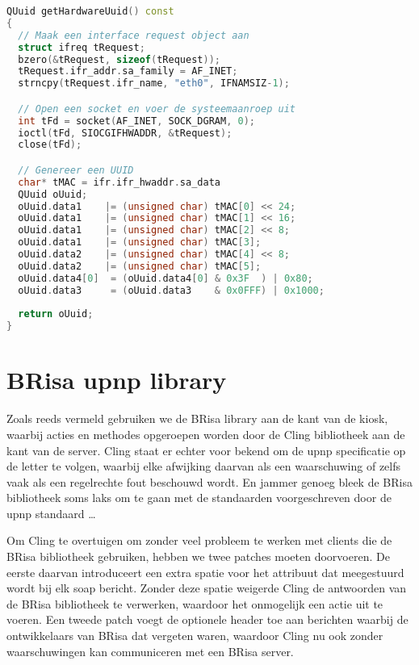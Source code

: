 \begin{lstlisting}[language=C++, float, caption=Generatie van een \acs{uuid}., label=lst:uuid]
QUuid getHardwareUuid() const
{
  // Maak een interface request object aan
  struct ifreq tRequest;
  bzero(&tRequest, sizeof(tRequest));
  tRequest.ifr_addr.sa_family = AF_INET;
  strncpy(tRequest.ifr_name, "eth0", IFNAMSIZ-1);

  // Open een socket en voer de systeemaanroep uit
  int tFd = socket(AF_INET, SOCK_DGRAM, 0);
  ioctl(tFd, SIOCGIFHWADDR, &tRequest);
  close(tFd);

  // Genereer een UUID
  char* tMAC = ifr.ifr_hwaddr.sa_data
  QUuid oUuid;
  oUuid.data1    |= (unsigned char) tMAC[0] << 24;
  oUuid.data1    |= (unsigned char) tMAC[1] << 16;
  oUuid.data1    |= (unsigned char) tMAC[2] << 8;
  oUuid.data1    |= (unsigned char) tMAC[3];
  oUuid.data2    |= (unsigned char) tMAC[4] << 8;
  oUuid.data2    |= (unsigned char) tMAC[5];
  oUuid.data4[0]  = (oUuid.data4[0] & 0x3F  ) | 0x80;
  oUuid.data3     = (oUuid.data3    & 0x0FFF) | 0x1000;
  
  return oUuid;
}
\end{lstlisting}

\section{BRisa \acs{upnp} library}
\label{kiosk:realisatie:brisa}

Zoals reeds vermeld gebruiken we de BRisa library aan de kant van de kiosk, waarbij acties en methodes opgeroepen worden door de Cling bibliotheek aan de kant van de server. Cling staat er echter voor bekend om de \ac{upnp} specificatie op de letter te volgen, waarbij elke afwijking daarvan als een waarschuwing of zelfs vaak als een regelrechte fout beschouwd wordt. En jammer genoeg bleek de BRisa bibliotheek soms laks om te gaan met de standaarden voorgeschreven door de \ac{upnp} standaard \ldots

Om Cling te overtuigen om zonder veel probleem te werken met clients die de BRisa bibliotheek gebruiken, hebben we twee patches moeten doorvoeren. De eerste daarvan introduceert een extra spatie voor het  attribuut dat meegestuurd wordt bij elk \ac{soap} bericht. Zonder deze spatie weigerde Cling de antwoorden van de BRisa bibliotheek te verwerken, waardoor het onmogelijk een actie uit te voeren. Een tweede patch voegt de optionele  header toe aan berichten waarbij de ontwikkelaars van BRisa dat vergeten waren, waardoor Cling nu ook zonder waarschuwingen kan communiceren met een BRisa server.

